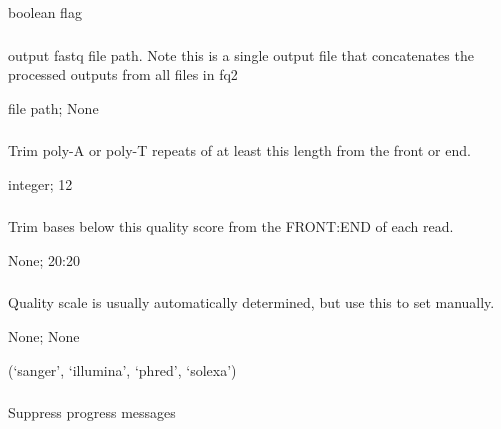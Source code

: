 \documentclass[letterpaper,10pt,english]{sphinxmanual}
\begin{document}
 boolean flag


\subsubsection{}
\label{\detokenize{prog_desc:out2}}
 output fastq file path. Note this is a single output file that concatenates the processed outputs from all files in \textendash{}fq2

 file path;  None


\subsubsection{}
\label{\detokenize{prog_desc:p-trim-poly}}
 Trim poly-A or poly-T repeats of at least this length from the front or end.

 integer;  12


\subsubsection{}
\label{\detokenize{prog_desc:q-trim-qual}}
 Trim bases below this quality score from the FRONT:END of each read.

 None;  20:20


\subsubsection{}
\label{\detokenize{prog_desc:quality-scale}}
 Quality scale is usually automatically determined, but use this to set manually.

 None;  None

 (‘sanger’, ‘illumina’, ‘phred’, ‘solexa’)


\subsubsection{}
\label{\detokenize{prog_desc:id6}}
 Suppress progress messages
\end{document}

